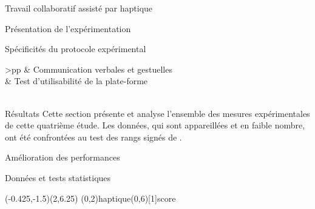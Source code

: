 \documentclass[myfrancais,ngerman,english,frenchb]{mythesis}
\begin{document}
\begin{mychapter}{Travail collaboratif assisté par haptique}
\begin{mysection}{Présentation de l'expérimentation}
\begin{mysubsection}{Spécificités du protocole expérimental}
\begin{mytable}
\begin{mytabular}{>{\bfseries}p{\expfourfirstcolumn}p{\expfoursecondcolumn}}
						                                           &  Communication verbales et gestuelles                           \\
						                                           &  Test d'utilisabilité de la plate-forme                         \\
						\mymiddlerule[\heavyrulewidth]
						 \\
						\mybottomrule
					\end{mytabular}
				\end{mytable}
			\end{mysubsection}
		\end{mysection}
		\begin{mysection}{Résultats}
			Cette section présente et analyse l'ensemble des mesures expérimentales de cette quatrième étude.
			Les données, qui sont appareillées et en faible nombre, ont été confrontées au test des rangs signés de .
			\begin{mysubsection}{Amélioration des performances}
				\begin{mysubsubsection}{Données et tests statistiques}
					\begin{myfigure}
						\begin{myps}(-0.425,-1.5)(2,6.25)
							\myaxes(0,2){haptique}(0,6)[1]{score }
						\end{myps}
					\end{myfigure}


\end{mysubsubsection}
\end{mysubsection}
\end{mysection}
\end{mychapter}
\end{document}
